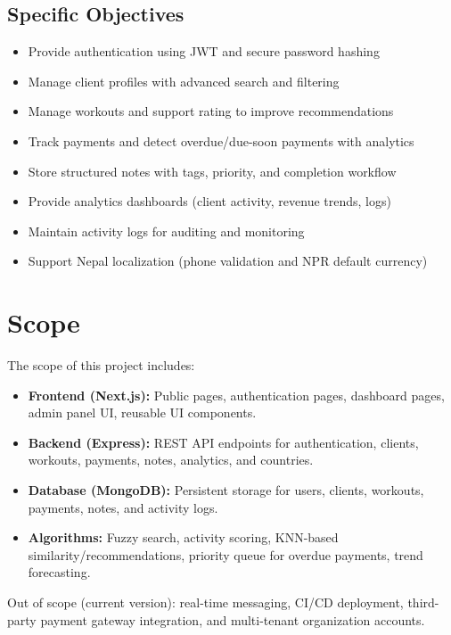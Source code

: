 \documentclass[12pt,a4paper]{report}
\begin{document}
\subsection*{Specific Objectives}
\begin{itemize}[leftmargin=*]
  \item Provide authentication using JWT and secure password hashing
  \item Manage client profiles with advanced search and filtering
  \item Manage workouts and support rating to improve recommendations
  \item Track payments and detect overdue/due-soon payments with analytics
  \item Store structured notes with tags, priority, and completion workflow
  \item Provide analytics dashboards (client activity, revenue trends, logs)
  \item Maintain activity logs for auditing and monitoring
  \item Support Nepal localization (phone validation and NPR default currency)
\end{itemize}

\section{Scope}
The scope of this project includes:
\begin{itemize}[leftmargin=*]
  \item \textbf{Frontend (Next.js):} Public pages, authentication pages, dashboard pages, admin panel UI, reusable UI components.
  \item \textbf{Backend (Express):} REST API endpoints for authentication, clients, workouts, payments, notes, analytics, and countries.
  \item \textbf{Database (MongoDB):} Persistent storage for users, clients, workouts, payments, notes, and activity logs.
  \item \textbf{Algorithms:} Fuzzy search, activity scoring, KNN-based similarity/recommendations, priority queue for overdue payments, trend forecasting.
\end{itemize}
Out of scope (current version): real-time messaging, CI/CD deployment, third-party payment gateway integration, and multi-tenant organization accounts.
\end{document}

